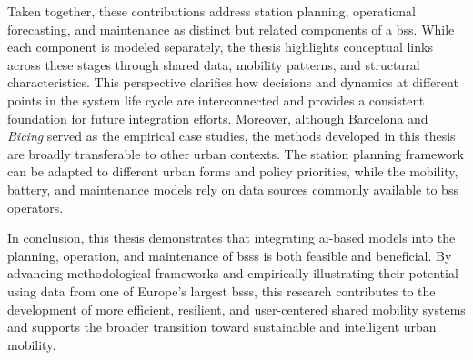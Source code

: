 Taken together, these contributions address station planning, operational forecasting, and maintenance as distinct but related components of a \ac{bss}. While each component is modeled separately, the thesis highlights conceptual links across these stages through shared data, mobility patterns, and structural characteristics. This perspective clarifies how decisions and dynamics at different points in the system life cycle are interconnected and provides a consistent foundation for future integration efforts. Moreover, although Barcelona and \textit{Bicing} served as the empirical case studies, the methods developed in this thesis are broadly transferable to other urban contexts. The station planning framework can be adapted to different urban forms and policy priorities, while the mobility, battery, and maintenance models rely on data sources commonly available to \ac{bss} operators.

In conclusion, this thesis demonstrates that integrating \ac{ai}-based models into the planning, operation, and maintenance of \acp{bss} is both feasible and beneficial. By advancing methodological frameworks and empirically illustrating their potential using data from one of Europe’s largest \acp{bss}, this research contributes to the development of more efficient, resilient, and user-centered shared mobility systems and supports the broader transition toward sustainable and intelligent urban mobility.